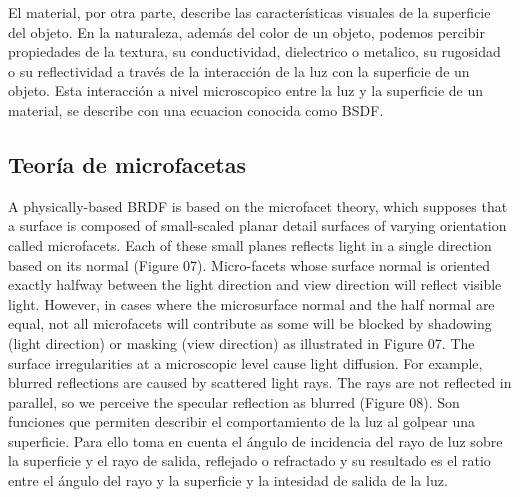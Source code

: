     El material, por otra parte, describe las caracter\'isticas visuales de la superficie del objeto. En la naturaleza, adem\'as del color de un objeto,
    podemos percibir propiedades de la textura, su conductividad, dielectrico o metalico, su rugosidad o su reflectividad a trav\'es de la interacci\'on
    de la luz con la superficie de un objeto. Esta interacci\'on a nivel microscopico entre la luz y la superficie de un material, se describe con una
    ecuacion conocida como BSDF.

    \subsection{Teor\'ia de microfacetas}
    A physically-based BRDF is based on the microfacet theory,
    which supposes that a surface is composed of small-scaled
    planar detail surfaces of varying orientation called microfacets.
    Each of these small planes reflects light in a single direction
    based on its normal (Figure 07).
    Micro-facets whose surface normal is oriented exactly halfway
    between the light direction and view direction will reflect visible
    light. However, in cases where the microsurface normal and
    the half normal are equal, not all microfacets will contribute as
    some will be blocked by shadowing (light direction) or masking
    (view direction) as illustrated in Figure 07.
    The surface irregularities at a microscopic level cause light
    diffusion. For example, blurred reflections are caused by
    scattered light rays. The rays are not reflected in parallel, so we
    perceive the specular reflection as blurred (Figure 08).
    Son funciones que permiten describir el comportamiento de la luz al golpear una superficie. Para ello toma en cuenta el \'angulo de incidencia del
    rayo de luz sobre la superficie y el rayo de salida, reflejado o refractado y su resultado es el ratio entre el \'angulo del rayo y la superficie y
    la intesidad de salida de la luz.

